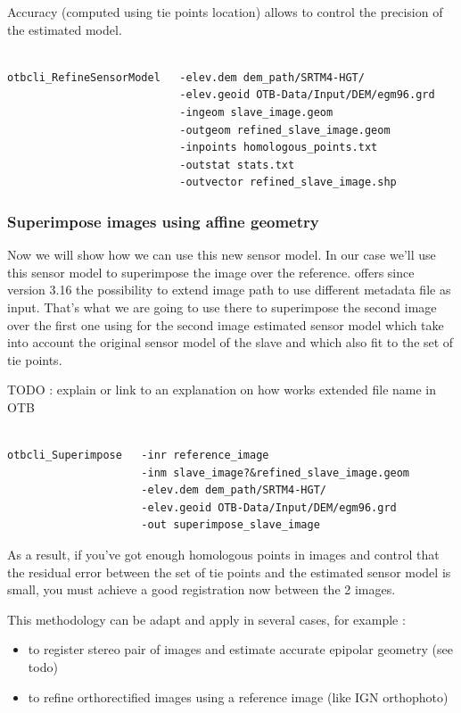 Accuracy (computed using tie points location) allows to control the precision of
the estimated model.

\begin{verbatim}

otbcli_RefineSensorModel   -elev.dem dem_path/SRTM4-HGT/ 
                           -elev.geoid OTB-Data/Input/DEM/egm96.grd 
                           -ingeom slave_image.geom 
                           -outgeom refined_slave_image.geom 
                           -inpoints homologous_points.txt 
                           -outstat stats.txt 
                           -outvector refined_slave_image.shp

\end{verbatim}

\subsubsection{Superimpose images using affine geometry}

Now we will show how we can use this new sensor model. In our case we'll use
this sensor model to superimpose the image over the reference. \otb offers since
version 3.16 the possibility to extend image path to use different metadata file
as input. That's what we are going to use there to superimpose the second image
over the first one using for the second image estimated sensor model which take
into account the original sensor model of the slave and which also fit to the
set of tie points.

TODO : explain or link to an explanation on how works extended file name in OTB  

\begin{verbatim}

otbcli_Superimpose   -inr reference_image
                     -inm slave_image?&refined_slave_image.geom 
                     -elev.dem dem_path/SRTM4-HGT/ 
                     -elev.geoid OTB-Data/Input/DEM/egm96.grd 
                     -out superimpose_slave_image 

\end{verbatim}

As a result, if you've got enough homologous points in images and control that
the residual error between the set of tie points and the estimated sensor model
is small, you must achieve a good registration now between the 2 images.

This methodology can be adapt and apply in several cases, for example :
\begin{itemize}

\item to register stereo pair of images and estimate accurate epipolar geometry (see todo)
\item to refine orthorectified images using a reference image (like IGN orthophoto) 

\end{itemize}
